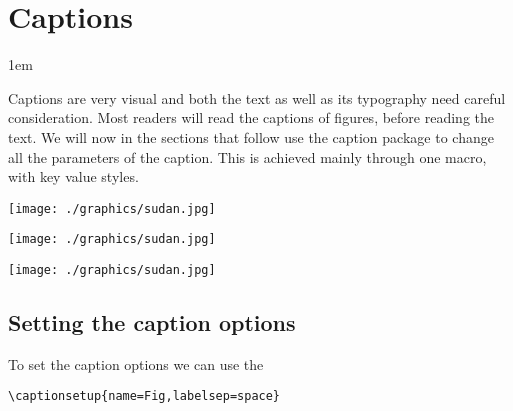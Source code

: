 \chapter{Captions}


\parindent1em

Captions are very visual and both the text as well as its typography need careful consideration. Most readers will read the captions of figures, before reading the text. We will now in the sections that follow use the caption package to change all the parameters of the caption. This is achieved mainly through one macro, with key value styles.



\DeclareRobustCommand\acaption{\protect\RaggedRight Lorem ipsum caption \protect\ldots.}

\begin{figure*}[h]
\captionsetup{format=plain}
\captionsetup{skip=3pt}
\captionsetup{font=small}
\captionsetup{name=Fig}
\captionsetup[figure]{labelfont=bf,textfont=it}
\RaggedRight
\centering 
\begin{minipage}[t]{90pt}
 \texttt{[image: ./graphics/sudan.jpg]}
 \caption{\acaption }
\end{minipage}
\captionsetup{name=Figure}
\begin{minipage}[t]{90pt}
 \texttt{[image: ./graphics/sudan.jpg]}
 \caption{\acaption }
\end{minipage}
\captionsetup{name=Fig,labelsep=space}
\begin{minipage}[t]{90pt}
 \texttt{[image: ./graphics/sudan.jpg]}
 \caption{\acaption }
\end{minipage}
 \caption{Three boys example (changing the figure name).}
\end{figure*}

\section{Setting the caption options}
To set the caption options we can use the 
\begin{verbatim}
\captionsetup{name=Fig,labelsep=space}
\end{verbatim}

\begin{comment}
%
\end{comment}

